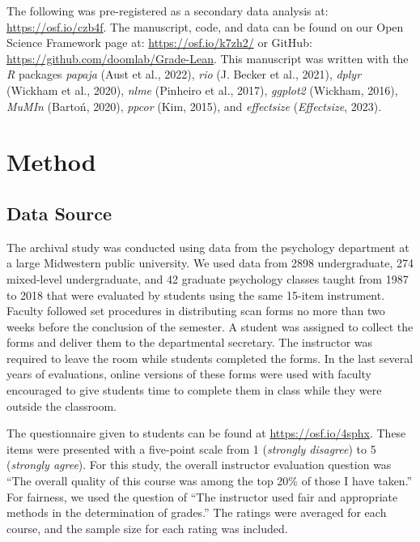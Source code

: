 \documentclass[
  man]{apa7}
\begin{document}
The following was pre-registered as a secondary data analysis at:
\url{https://osf.io/czb4f}. The manuscript, code, and data can be found on
our Open Science Framework page at: \url{https://osf.io/k7zh2/} or GitHub:
\url{https://github.com/doomlab/Grade-Lean}. This manuscript was written
with the \emph{R} packages \emph{papaja} (Aust et al., 2022), \emph{rio} (J. Becker et al., 2021), \emph{dplyr}
(Wickham et al., 2020), \emph{nlme} (Pinheiro et al., 2017), \emph{ggplot2} (Wickham, 2016), \emph{MuMIn}
(Bartoń, 2020), \emph{ppcor} (Kim, 2015), and \emph{effectsize} (\emph{Effectsize}, 2023).

\hypertarget{method}{%
\section{Method}\label{method}}

\hypertarget{data-source}{%
\subsection{Data Source}\label{data-source}}

The archival study was conducted using data from the psychology
department at a large Midwestern public university. We used data from
2898
undergraduate, 274
mixed-level undergraduate, and
42 graduate
psychology classes taught from 1987 to 2018 that were evaluated by
students using the same 15-item instrument. Faculty followed set
procedures in distributing scan forms no more than two weeks before the
conclusion of the semester. A student was assigned to collect the forms
and deliver them to the departmental secretary. The instructor was
required to leave the room while students completed the forms. In the
last several years of evaluations, online versions of these forms were
used with faculty encouraged to give students time to complete them in
class while they were outside the classroom.

The questionnaire given to students can be found at
\url{https://osf.io/4sphx}. These items were presented with a five-point
scale from 1 (\emph{strongly disagree}) to 5 (\emph{strongly agree}). For this
study, the overall instructor evaluation question was ``The overall
quality of this course was among the top 20\% of those I have taken.'' For
fairness, we used the question of ``The instructor used fair and
appropriate methods in the determination of grades.'' The ratings were
averaged for each course, and the sample size for each rating was
included.
\end{document}
